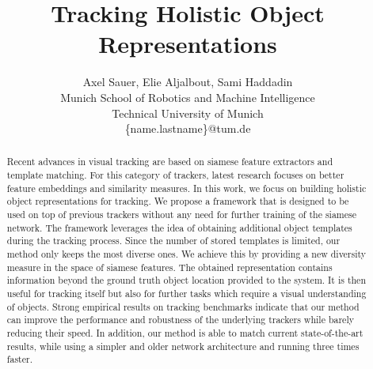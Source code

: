 \documentclass{article}
\title{Tracking Holistic Object Representations}
\author{Axel Sauer\footnotemark[1], Elie Aljalbout\footnotemark[1], Sami Haddadin\\
Munich School of Robotics and Machine Intelligence\\
Technical University of Munich\\
\big\{name.lastname\big\}@tum.de}
\date{}
\begin{document}
\renewcommand*{\thefootnote}{\fnsymbol{footnote}}
\renewcommand*{\thefootnote}{\arabic{footnote}}
\maketitle
\begin{abstract}
Recent advances in visual tracking are based on siamese feature extractors and template matching. For this category of trackers, latest research focuses on better feature embeddings and similarity measures. In this work, we focus on building holistic object representations for tracking. We propose a framework that is designed to be used on top of previous trackers without any need for further training of the siamese network. The framework leverages the idea of obtaining additional object templates during the tracking process. Since the number of stored templates is limited, our method only keeps the most diverse ones. We achieve this by providing a new diversity measure in the space of siamese features. The obtained representation contains information beyond the ground truth object location provided to the system. It is then useful for tracking itself but also for further tasks which require a visual understanding of objects. Strong empirical results on tracking benchmarks indicate that our method can improve the performance and robustness of the underlying trackers while barely reducing their speed. In addition, our method is able to match current state-of-the-art results, while using a simpler and older network architecture and running three times faster.
\end{abstract}
\end{document}
